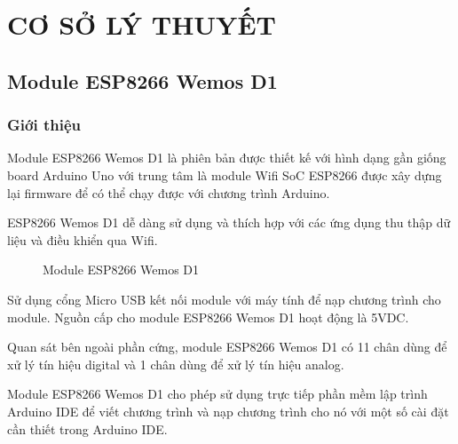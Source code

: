\chapter{CƠ SỞ LÝ THUYẾT}

\section{Module ESP8266 Wemos D1}
\subsection{Giới thiệu}
    Module ESP8266 Wemos D1 là phiên bản được thiết kế với hình dạng gần giống board Arduino Uno với trung tâm là module Wifi SoC ESP8266 được xây dựng lại firmware để có thể chạy được với chương trình Arduino.

    ESP8266 Wemos D1 dễ dàng sử dụng và thích hợp với các ứng dụng thu thập dữ liệu và điều khiển qua Wifi.
        \begin{figure}[htp]
            \begin{center}
            \end{center}
            \caption{Module ESP8266 Wemos D1}
            \label{Fig:esp8266-wemos-d1}
        \end{figure}

    Sử dụng cổng Micro USB kết nối module với máy tính để nạp chương trình cho module. Nguồn cấp cho module ESP8266 Wemos D1 hoạt động là 5VDC.

    Quan sát bên ngoài phần cứng, module ESP8266 Wemos D1 có 11 chân dùng để xử lý tín hiệu digital và 1 chân dùng để xử lý tín hiệu analog.

    Module ESP8266 Wemos D1 cho phép sử dụng trực tiếp phần mềm lập trình Arduino IDE để viết chương trình và nạp chương trình cho nó với một số cài đặt cần thiết trong Arduino IDE.
